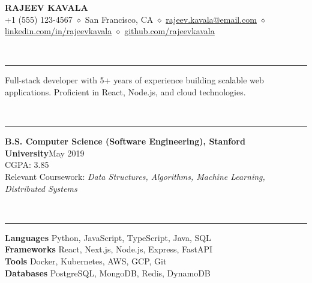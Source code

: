 \documentclass[letterpaper,11pt]{article}
\begin{document}
\begin{center}
  {\LARGE\bfseries RAJEEV KAVALA}\\
  \vspace{2pt}\small +1 (555) 123-4567 $\diamond$ San Francisco, CA $\diamond$ {\color{cyan}\href{\detokenize{mailto:rajeev.kavala@email.com}}{rajeev.kavala@email.com}} $\diamond$ {\color{cyan}\href{\detokenize{https://linkedin.com/in/rajeevkavala}}{linkedin.com/in/rajeevkavala}} $\diamond$ {\color{cyan}\href{\detokenize{https://github.com/rajeevkavala}}{github.com/rajeevkavala}}
\end{center}
\vspace{4pt}
\par
{}\\
\vspace{2pt}\hrule\vspace{4pt}
Full-stack developer with 5+ years of experience building scalable web applications. Proficient in React, Node.js, and cloud technologies.
\par\vspace{6pt}
\par
{}\\
\vspace{2pt}\hrule\vspace{4pt}
\textbf{B.S. Computer Science (Software Engineering), Stanford University}\hfill May 2019\\
CGPA: 3.85\\
Relevant Coursework: \textit{Data Structures, Algorithms, Machine Learning, Distributed Systems}\\
\par\vspace{3pt}
\par\vspace{6pt}
\par
{}\\
\vspace{2pt}\hrule\vspace{4pt}
\textbf{Languages} \quad Python, JavaScript, TypeScript, Java, SQL\\
\textbf{Frameworks} \quad React, Next.js, Node.js, Express, FastAPI\\
\textbf{Tools} \quad Docker, Kubernetes, AWS, GCP, Git\\
\textbf{Databases} \quad PostgreSQL, MongoDB, Redis, DynamoDB\\
\par\vspace{6pt}
\end{document}
